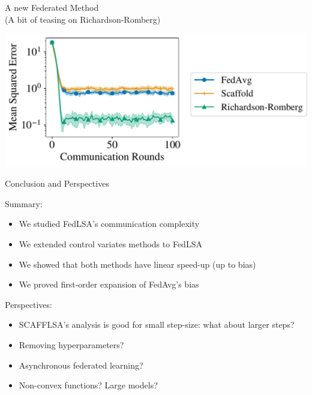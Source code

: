 \documentclass[aspectratio=169,14pt]{beamer}
\begin{document}
  \begin{frame}{A new Federated Method\\[-0.5em]
    \small (A bit of teasing on Richardson-Romberg)}
    \vspace{-1em}
    
    \begin{center}
      \includegraphics[width=0.8\linewidth]{images/heterogeneous_iterates_100_all_methods.pdf}
    \end{center}

  \end{frame}
  
  
  \begin{frame}{Conclusion and Perspectives}

    \vspace{-1em}
        
    Summary:

    \vspace{-0.5em}

    \begin{itemize}
    \small      
    \item We studied FedLSA's communication complexity
    \item We extended control variates methods to FedLSA
    \item We showed that both methods have linear speed-up (up to bias)
    \item We proved first-order expansion of FedAvg's bias
    \end{itemize}

    \pause

    Perspectives:

    \vspace{-0.5em}
    
    \begin{itemize}
    \small
    \item SCAFFLSA's analysis is good for small step-size: what about larger steps?
    \item Removing hyperparameters?
    \item Asynchronous federated learning?
    \item Non-convex functions? Large models?
    \end{itemize}
  \end{frame}
\end{document}
